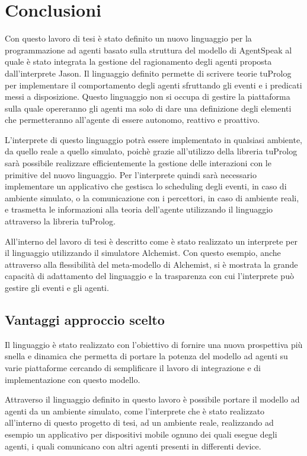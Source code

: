 \chapter{Conclusioni}\label{chap:conclusions}
Con questo lavoro di tesi è stato definito un nuovo linguaggio per la programmazione ad agenti basato sulla struttura del modello di AgentSpeak al quale è stato integrata la gestione del ragionamento degli agenti proposta dall'interprete Jason.
%
Il linguaggio definito permette di scrivere teorie tuProlog per implementare il comportamento degli agenti sfruttando gli eventi e i predicati messi a disposizione.
Questo linguaggio non si occupa di gestire la piattaforma sulla quale opereranno gli agenti ma solo di dare una definizione degli elementi che permetteranno all'agente di essere autonomo, reattivo e proattivo.

L'interprete di questo linguaggio potrà essere implementato in qualsiasi ambiente, da quello reale a quello simulato, poichè grazie all'utilizzo della libreria tuProlog sarà possibile realizzare efficientemente la gestione delle interazioni con le primitive del nuovo linguaggio.
%
Per l'interprete quindi sarà necessario implementare un applicativo che gestisca lo scheduling degli eventi, in caso di ambiente simulato, o la comunicazione con i percettori, in caso di ambiente reali, e trasmetta le informazioni alla teoria dell'agente utilizzando il linguaggio attraverso la libreria tuProlog.

All'interno del lavoro di tesi è descritto come è stato realizzato un interprete per il linguaggio utilizzando il simulatore Alchemist.
Con questo esempio, anche attraverso alla flessibilità del meta-modello di Alchemist, si è mostrata la grande capacità di adattamento del linguaggio e la trasparenza con cui l'interprete può gestire gli eventi e gli agenti. 

\section{Vantaggi approccio scelto}
Il linguaggio è stato realizzato con l'obiettivo di fornire una nuova prospettiva più snella e dinamica che permetta di portare la potenza del modello ad agenti su varie piattaforme cercando di semplificare il lavoro di integrazione e di implementazione con questo modello.

Attraverso il linguaggio definito in questo lavoro è possibile portare il modello ad agenti da un ambiente simulato, come l'interprete che è stato realizzato all'interno di questo progetto di tesi, ad un ambiente reale, realizzando ad esempio un applicativo per dispositivi mobile ognuno dei quali esegue degli agenti, i quali comunicano con altri agenti presenti in differenti device.